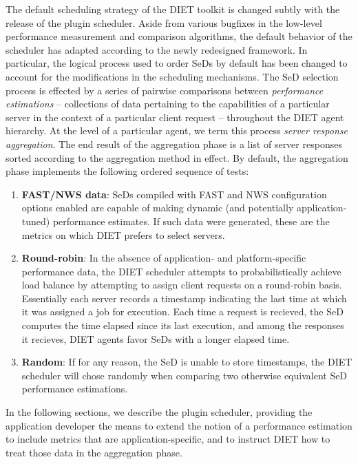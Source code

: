The default scheduling strategy of the DIET toolkit is changed subtly
with the release of the plugin scheduler.  Aside from various bugfixes
in the low-level
performance measurement and comparison algorithms, the default
behavior of the scheduler has adapted according to the newly
redesigned framework.  In particular, the logical process used to
order SeDs by default has been changed to account for the
modifications in
the scheduling mechanisms.  The SeD selection process is effected by a
series of pairwise comparisons between
\emph{performance estimations} -- collections of data pertaining to
the capabilities of a particular server in the context of a particular
client request -- throughout the DIET agent hierarchy.  At the level
of a particular agent, we term this process
\emph{server response aggregation}.  The end result of the aggregation
phase is a list of server responses sorted according to the
aggregation method in effect.
By default, the aggregation phase
implements the following ordered sequence of tests:

\begin{enumerate}
\item \textbf{FAST/NWS data}: SeDs compiled with FAST and NWS
  configuration options enabled are capable of making dynamic (and
  potentially application-tuned) performance estimates.  If such data
  were generated, these are the metrics on which DIET prefers to
  select servers.
\item \textbf{Round-robin}: In the absence of application- and
  platform-specific performance
  data, the DIET scheduler attempts to probabilistically achieve load
  balance by attempting to assign client requests on a round-robin
  basis.  Essentially each server records a timestamp indicating the
  last time at which it was assigned a job for execution.  Each time a
  request is recieved, the SeD computes the time elapsed since its
  last execution, and among the responses it recieves, DIET agents
  favor SeDs with a longer elapsed time.
\item \textbf{Random}: If for any reason, the SeD is unable to store
  timestamps, the DIET scheduler will chose randomly when
  comparing two otherwise equivalent SeD performance estimations.
\end{enumerate}

In the following sections, we describe the plugin scheduler, providing
the application developer the means to extend the notion of a
performance estimation to include metrics that are
application-specific, and to instruct DIET how to treat those data in
the aggregation phase.



